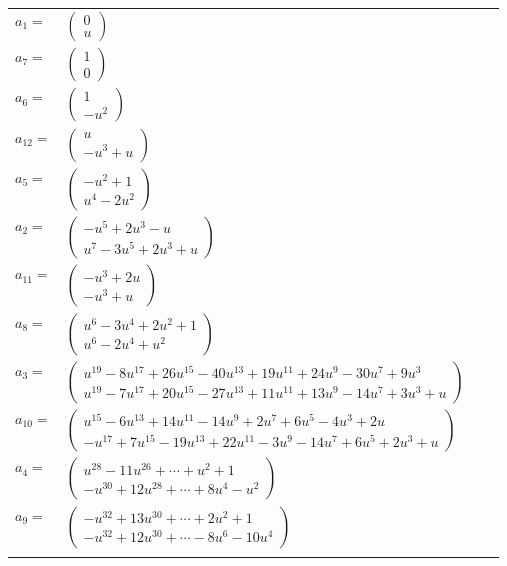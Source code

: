 \documentclass[1p]{elsarticle_modified}
\theoremstyle{definition}
\begin{document}
\begin{tabular}{m{7pt} m{180pt} m{7pt} m{180pt} }
\flushright $a_{1}=$&$\begin{pmatrix}0\\u\end{pmatrix}$ \\
\flushright $a_{7}=$&$\begin{pmatrix}1\\0\end{pmatrix}$ \\
\flushright $a_{6}=$&$\begin{pmatrix}1\\- u^2\end{pmatrix}$ \\
\flushright $a_{12}=$&$\begin{pmatrix}u\\- u^3+u\end{pmatrix}$ \\
\flushright $a_{5}=$&$\begin{pmatrix}- u^2+1\\u^4-2 u^2\end{pmatrix}$ \\
\flushright $a_{2}=$&$\begin{pmatrix}- u^5+2 u^3- u\\u^7-3 u^5+2 u^3+u\end{pmatrix}$ \\
\flushright $a_{11}=$&$\begin{pmatrix}- u^3+2 u\\- u^3+u\end{pmatrix}$ \\
\flushright $a_{8}=$&$\begin{pmatrix}u^6-3 u^4+2 u^2+1\\u^6-2 u^4+u^2\end{pmatrix}$ \\
\flushright $a_{3}=$&$\begin{pmatrix}u^{19}-8 u^{17}+26 u^{15}-40 u^{13}+19 u^{11}+24 u^9-30 u^7+9 u^3\\u^{19}-7 u^{17}+20 u^{15}-27 u^{13}+11 u^{11}+13 u^9-14 u^7+3 u^3+u\end{pmatrix}$ \\
\flushright $a_{10}=$&$\begin{pmatrix}u^{15}-6 u^{13}+14 u^{11}-14 u^9+2 u^7+6 u^5-4 u^3+2 u\\- u^{17}+7 u^{15}-19 u^{13}+22 u^{11}-3 u^9-14 u^7+6 u^5+2 u^3+u\end{pmatrix}$ \\
\flushright $a_{4}=$&$\begin{pmatrix}u^{28}-11 u^{26}+\cdots+u^2+1\\- u^{30}+12 u^{28}+\cdots+8 u^4- u^2\end{pmatrix}$ \\
\flushright $a_{9}=$&$\begin{pmatrix}- u^{32}+13 u^{30}+\cdots+2 u^2+1\\- u^{32}+12 u^{30}+\cdots-8 u^6-10 u^4\end{pmatrix}$\\&\end{tabular}
\end{document}

